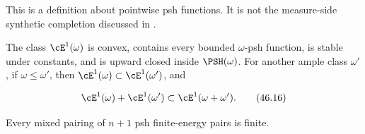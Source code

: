 This is a definition about pointwise psh functions.  It is not the
measure-side synthetic completion discussed in
.

\begin{theorem}\label{thm:bj-e1-basic}
The class $\cE^1(\omega)$ is convex, contains every bounded
$\omega$-psh function, is stable under constants, and is upward closed
inside $\PSH(\omega)$.  For another ample class $\omega'$, if
$\omega\leq\omega'$, then
$\cE^1(\omega)\subset\cE^1(\omega')$, and

\[
 \cE^1(\omega)+\cE^1(\omega')
       \subset\cE^1(\omega+\omega').
\tag{46.16}\label{eq:bj-e1-addition}
\]

Every mixed pairing of $n+1$ psh finite-energy pairs is finite.
\end{theorem}

